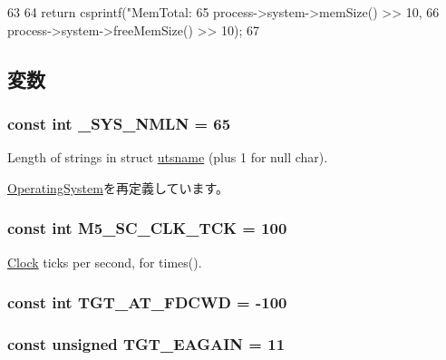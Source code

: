 \begin{DoxyCode}
63 {
64     return csprintf("MemTotal:%
65             process->system->memSize() >> 10,
66             process->system->freeMemSize() >> 10);
67 }
\end{DoxyCode}


\subsection{変数}
\hypertarget{classLinux_a1a19d4c9718c9a4ad5fa2e48271fccc9}{
\subsubsection[{\_\-SYS\_\-NMLN}]{\setlength{\rightskip}{0pt plus 5cm}const int {\bf \_\-SYS\_\-NMLN} = 65}}
\label{classLinux_a1a19d4c9718c9a4ad5fa2e48271fccc9}


Length of strings in struct \hyperlink{structLinux_1_1utsname}{utsname} (plus 1 for null char). 

\hyperlink{classOperatingSystem_a1a19d4c9718c9a4ad5fa2e48271fccc9}{OperatingSystem}を再定義しています。\hypertarget{classLinux_a06eb9dad0a85c4478f07f398cd87b3f1}{
\subsubsection[{M5\_\-SC\_\-CLK\_\-TCK}]{\setlength{\rightskip}{0pt plus 5cm}const int {\bf M5\_\-SC\_\-CLK\_\-TCK} = 100}}
\label{classLinux_a06eb9dad0a85c4478f07f398cd87b3f1}


\hyperlink{classClock}{Clock} ticks per second, for times(). \hypertarget{classLinux_ac982d09ce88b29dcb1eb35091e2a6b5f}{
\subsubsection[{TGT\_\-AT\_\-FDCWD}]{\setlength{\rightskip}{0pt plus 5cm}const int {\bf TGT\_\-AT\_\-FDCWD} = -\/100}}
\label{classLinux_ac982d09ce88b29dcb1eb35091e2a6b5f}
\hypertarget{classLinux_aefc7de6c39dd68b971f1fe2c797acd04}{
\subsubsection[{TGT\_\-EAGAIN}]{\setlength{\rightskip}{0pt plus 5cm}const unsigned {\bf TGT\_\-EAGAIN} = 11}}
\label{classLinux_aefc7de6c39dd68b971f1fe2c797acd04}


